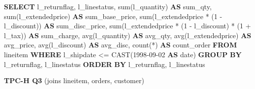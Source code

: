 \documentclass[
  10pt,
]{article}
\newenvironment{Shaded}{}{}
\newcommand{\DataTypeTok}[1]{\textcolor[rgb]{0.56,0.13,0.00}{#1}}
\newcommand{\DecValTok}[1]{\textcolor[rgb]{0.25,0.63,0.44}{#1}}
\newcommand{\FunctionTok}[1]{\textcolor[rgb]{0.02,0.16,0.49}{#1}}
\newcommand{\KeywordTok}[1]{\textcolor[rgb]{0.00,0.44,0.13}{\textbf{#1}}}
\newcommand{\NormalTok}[1]{#1}
\newcommand{\OperatorTok}[1]{\textcolor[rgb]{0.40,0.40,0.40}{#1}}
\newcommand{\StringTok}[1]{\textcolor[rgb]{0.25,0.44,0.63}{#1}}
\begin{document}
\begin{Shaded}
\begin{Highlighting}[]
\KeywordTok{SELECT}
\NormalTok{    l\_returnflag,}
\NormalTok{    l\_linestatus,}
    \FunctionTok{sum}\NormalTok{(l\_quantity) }\KeywordTok{AS}\NormalTok{ sum\_qty,}
    \FunctionTok{sum}\NormalTok{(l\_extendedprice) }\KeywordTok{AS}\NormalTok{ sum\_base\_price,}
    \FunctionTok{sum}\NormalTok{(l\_extendedprice }\OperatorTok{*}\NormalTok{ (}\DecValTok{1} \OperatorTok{{-}}\NormalTok{ l\_discount)) }\KeywordTok{AS}\NormalTok{ sum\_disc\_price,}
    \FunctionTok{sum}\NormalTok{(l\_extendedprice }\OperatorTok{*}\NormalTok{ (}\DecValTok{1} \OperatorTok{{-}}\NormalTok{ l\_discount) }\OperatorTok{*}\NormalTok{ (}\DecValTok{1} \OperatorTok{+}\NormalTok{ l\_tax)) }\KeywordTok{AS}\NormalTok{ sum\_charge,}
    \FunctionTok{avg}\NormalTok{(l\_quantity) }\KeywordTok{AS}\NormalTok{ avg\_qty,}
    \FunctionTok{avg}\NormalTok{(l\_extendedprice) }\KeywordTok{AS}\NormalTok{ avg\_price,}
    \FunctionTok{avg}\NormalTok{(l\_discount) }\KeywordTok{AS}\NormalTok{ avg\_disc,}
    \FunctionTok{count}\NormalTok{(}\OperatorTok{*}\NormalTok{) }\KeywordTok{AS}\NormalTok{ count\_order}
\KeywordTok{FROM}
\NormalTok{    lineitem}
\KeywordTok{WHERE}
\NormalTok{    l\_shipdate }\OperatorTok{\textless{}=} \FunctionTok{CAST}\NormalTok{(}\StringTok{\textquotesingle{}1998{-}09{-}02\textquotesingle{}} \KeywordTok{AS} \DataTypeTok{date}\NormalTok{)}
\KeywordTok{GROUP} \KeywordTok{BY}
\NormalTok{    l\_returnflag,}
\NormalTok{    l\_linestatus}
\KeywordTok{ORDER} \KeywordTok{BY}
\NormalTok{    l\_returnflag,}
\NormalTok{    l\_linestatus}
\end{Highlighting}
\end{Shaded}

\textbf{TPC-H Q3} (joins lineitem, orders, customer)
\end{document}
